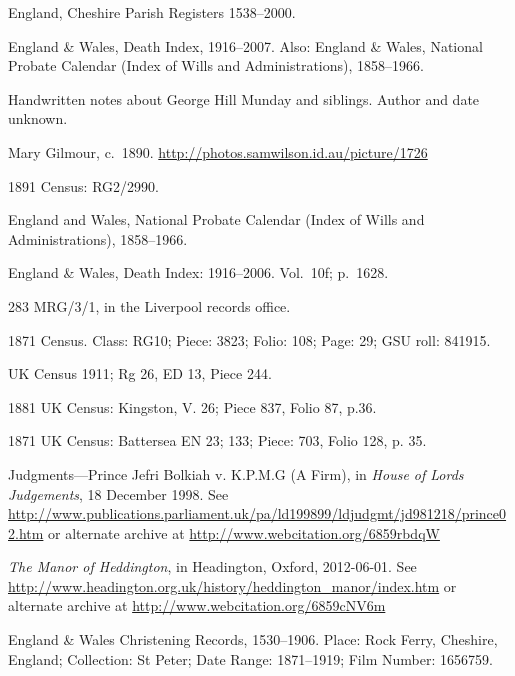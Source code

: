 \begin{thebibliography}{99}
\footnotesize

	England, Cheshire Parish Registers 1538--2000.

	England \& Wales, Death Index, 1916--2007.
	Also: England \& Wales, National Probate Calendar (Index of Wills and Administrations), 1858--1966.

	Handwritten notes about George Hill Munday and siblings. Author and date unknown.

	Mary Gilmour, c.~1890.
	\url{http://photos.samwilson.id.au/picture/1726}

	1891 Census: RG2/2990.

	England and Wales, National Probate Calendar (Index of Wills and Administrations), 1858--1966.

	England \& Wales, Death Index: 1916--2006. Vol.~10f; p.~1628.

	283 MRG/3/1, in the Liverpool records office.

	1871 Census. Class: RG10; Piece: 3823; Folio: 108; Page: 29; GSU roll: 841915.

	UK Census 1911; Rg 26, ED 13, Piece 244.

	1881 UK Census: Kingston, V. 26; Piece 837, Folio 87, p.36.

	1871 UK Census: Battersea EN 23; 133; Piece: 703, Folio 128, p. 35.

	Judgments---Prince Jefri Bolkiah v. K.P.M.G (A Firm), in \emph{House of Lords Judgements}, 18 December 1998.
	See \url{http://www.publications.parliament.uk/pa/ld199899/ldjudgmt/jd981218/prince02.htm}
	or alternate archive at \url{http://www.webcitation.org/6859rbdqW}

	\emph{The Manor of Heddington}, in Headington, Oxford, 2012-06-01.
	See \url{http://www.headington.org.uk/history/heddington_manor/index.htm} or alternate archive at \url{http://www.webcitation.org/6859cNV6m}

	England \& Wales Christening Records, 1530--1906.
	Place: Rock Ferry, Cheshire, England; Collection: St Peter; Date Range: 1871--1919; Film Number: 1656759.


\end{thebibliography}
